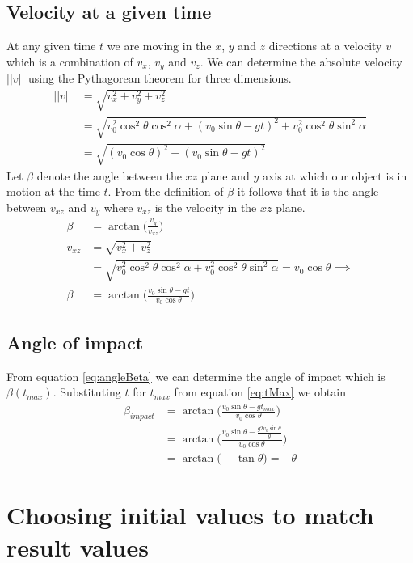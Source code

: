 \documentclass[%
aip,
jmp,
amsmath,amssymb,
reprint,%
]{revtex4-1}
\begin{document}
	\subsection{Velocity at a given time}
	At any given time $t$ we are moving in the $x$, $y$ and $z$ directions at a velocity $v$ which is a combination of $v_x$, $v_y$ and $v_z$. We can determine the absolute velocity $||v||$ using the Pythagorean theorem for three dimensions.
	\begin{align}\nonumber
		||v|| &= \sqrt{v_{x}^2+v_{y}^2+v_{z}^2}\\\nonumber
		&= \sqrt{v_{0}^2\cos^2\theta\cos^2\alpha+(v_0\sin\theta -gt)^2+v_{0}^2\cos^2\theta\sin^2\alpha}\\\nonumber
		&= \sqrt{({v_0\cos\theta})^2+({v_0\sin\theta-gt})^2}\nonumber
	\end{align}
	Let $\beta$ denote the angle between the $xz$ plane and $y$ axis at which our object is in motion at the time $t$. From the definition of $\beta$ it follows that it is the angle between $v_{xz}$ and $v_y$ where $v_{xz}$ is the velocity in the $xz$ plane.
	\begin{align}\nonumber
		\beta &= \arctan\Big(\frac{v_y}{v_{xz}}\Big)\\\nonumber 
		v_{xz} &= \sqrt{v_{x}^2+v_{z}^2}\\\nonumber
		&=\sqrt{v_{0}^2\cos^2\theta\cos^2\alpha + v_{0}^2\cos^2\theta\sin^2\alpha} = v_0\cos\theta \implies \\\label{eq:angleBeta}
		\beta &= \arctan\Big(\frac{v_0\sin\theta - gt}{v_0\cos\theta}\Big)
	\end{align}
	\subsection{Angle of impact}
	From equation \eqref{eq:angleBeta} we can determine the angle of impact which is $\beta(t_{max})$. Substituting $t$ for $t_{max}$ from equation \eqref{eq:tMax} we obtain
	\begin{align}\nonumber
		\beta_{impact} &= \arctan\Big(\frac{v_0\sin\theta - gt_{max}}{v_0\cos\theta}\Big)\\\nonumber
		&= \arctan\Big(\frac{v_0\sin\theta-\frac{g2v_0\sin\theta}{g}}{v_0\cos\theta}\Big)\\\nonumber
		&= \arctan\big(-\tan\theta\big) = -\theta\nonumber
	\end{align}
	\section{Choosing initial values to match result values}\label{seq:resultValues}
\end{document}

